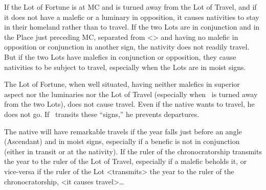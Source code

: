 If the Lot of Fortune is at MC and is turned away from the Lot of Travel, and if it does not have a malefic or a luminary in opposition, it causes nativities to stay in their homeland rather than to travel. If the two Lots are in conjunction and in the Place just preceding MC, separated from <\Mars> and having no malefic in opposition or conjunction in another sign, the nativity does not readily travel. But if the two Lots have malefics in conjunction or opposition, they cause nativities to be subject to travel, especially when the Lots are in moist signs. 

The Lot of Fortune, when well situated, having neither malefics in superior aspect nor the luminaries nor the Lot of Travel (especially when \Mars\, is turned away from the two Lots), does not cause travel. Even if the native wants to travel, he does not go. If \Jupiter\, transits these “signs,” he prevents departures. 

The native will have remarkable travels if the year falls just before an angle (Ascendant) and in moist signs, especially
if a benefic is not in conjunction (either in transit or at the nativity). If the ruler of the chronocratorship transmits the year to the ruler of the Lot of Travel, especially if a malefic beholds it, or vice-versa if the ruler of the Lot <transmits> the year to the ruler of the chronocratorship, <it causes travel>\ldots


\newpage